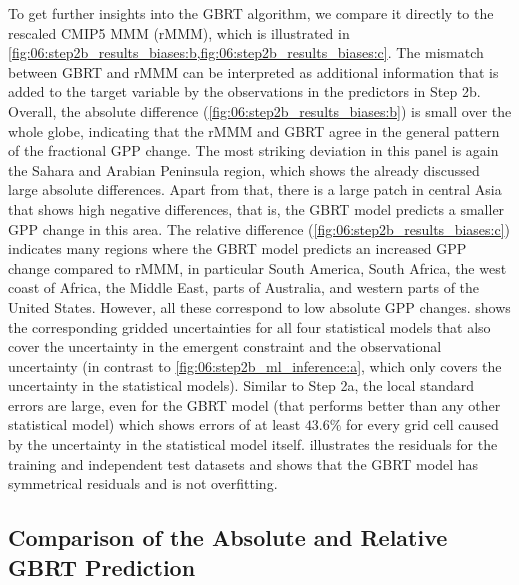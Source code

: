 To get further insights into the \ac{GBRT} algorithm, we compare it directly to
the rescaled \acs{CMIP}5 \ac{MMM} (r\acs{MMM}), which is illustrated in
\cref{fig:06:step2b_results_biases:b,fig:06:step2b_results_biases:c}. The
mismatch between \ac{GBRT} and r\acs{MMM} can be interpreted as additional
information that is added to the target variable by the observations in the
predictors in Step 2b. Overall, the absolute difference
(\cref{fig:06:step2b_results_biases:b}) is small over the whole globe,
indicating that the r\acs{MMM} and \ac{GBRT} agree in the general pattern of
the fractional \ac{GPP} change. The most striking deviation in this panel is
again the Sahara and Arabian Peninsula region, which shows the already
discussed large absolute differences. Apart from that, there is a large patch
in central Asia that shows high negative differences, that is, the \ac{GBRT}
model predicts a smaller \ac{GPP} change in this area. The relative difference
(\cref{fig:06:step2b_results_biases:c}) indicates many regions where the
\ac{GBRT} model predicts an increased \ac{GPP} change compared to r\acs{MMM},
in particular South America, South Africa, the west coast of Africa, the Middle
East, parts of Australia, and western parts of the United States. However, all
these correspond to low absolute \ac{GPP} changes.
 shows the corresponding gridded
uncertainties for all four statistical models that also cover the uncertainty
in the emergent constraint and the observational uncertainty (in contrast to
\cref{fig:06:step2b_ml_inference:a}, which only covers the uncertainty in the
statistical models). Similar to Step 2a, the local standard errors are large,
even for the \ac{GBRT} model (that performs better than any other statistical
model) which shows errors of at least $43.6 \unit{\%}$ for every grid cell
caused by the uncertainty in the statistical model itself.
 illustrates the residuals for the training and
independent test datasets and shows that the \ac{GBRT} model has symmetrical
residuals and is not overfitting.


\subsection{Comparison of the Absolute and Relative \acs{GBRT} Prediction}
\label{subsec:06:comparison_step2a_step2b}

